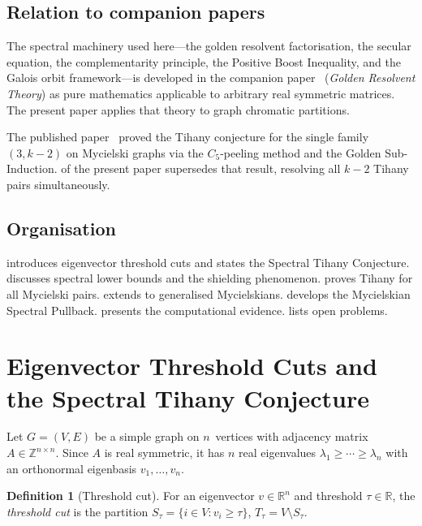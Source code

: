 \documentclass[11pt]{amsart}
\theoremstyle{definition}
\newtheorem{definition}[theorem]{Definition}
\theoremstyle{remark}
\newcommand{\R}{\mathbb{R}}
\newcommand{\Z}{\mathbb{Z}}
\begin{document}
\subsection{Relation to companion papers}

The spectral machinery used here---the golden resolvent factorisation, 
the secular equation, the complementarity principle, the Positive 
Boost Inequality, and the Galois orbit framework---is developed in 
the companion paper~\cite{santos-grt-2026} (\emph{Golden Resolvent 
Theory}) as pure mathematics applicable to arbitrary real symmetric 
matrices.  The present paper applies that theory to graph chromatic 
partitions.

The published paper~\cite{santos-golden-2026} proved the Tihany 
conjecture for the single family $(3, k{-}2)$ on Mycielski graphs 
via the $C_5$-peeling method and the Golden Sub-Induction.  
 of the present paper supersedes that 
result, resolving all $k{-}2$ Tihany pairs simultaneously.

\subsection{Organisation}

 introduces eigenvector threshold cuts 
and states the Spectral Tihany Conjecture.   
discusses spectral lower bounds and the shielding phenomenon.  
 proves Tihany for all Mycielski pairs.  
 extends to generalised Mycielskians.  
 develops the Mycielskian Spectral Pullback.  
 presents the computational evidence.  
 lists open problems.


\section{Eigenvector Threshold Cuts and the Spectral Tihany Conjecture}
\label{sec:spectral-tihany}

Let $G = (V, E)$ be a simple graph on $n$~vertices with adjacency 
matrix $A \in \Z^{n \times n}$.  Since $A$ is real symmetric, it has 
$n$ real eigenvalues $\lambda_1 \ge \cdots \ge \lambda_n$ with an 
orthonormal eigenbasis $v_1, \ldots, v_n$.

\begin{definition}[Threshold cut]\label{def:threshold}
For an eigenvector $v \in \R^n$ and threshold $\tau \in \R$, the 
\emph{threshold cut} is the partition 
$S_\tau = \{i \in V : v_i \ge \tau\}$, $T_\tau = V \setminus S_\tau$.
\end{definition}
\end{document}
